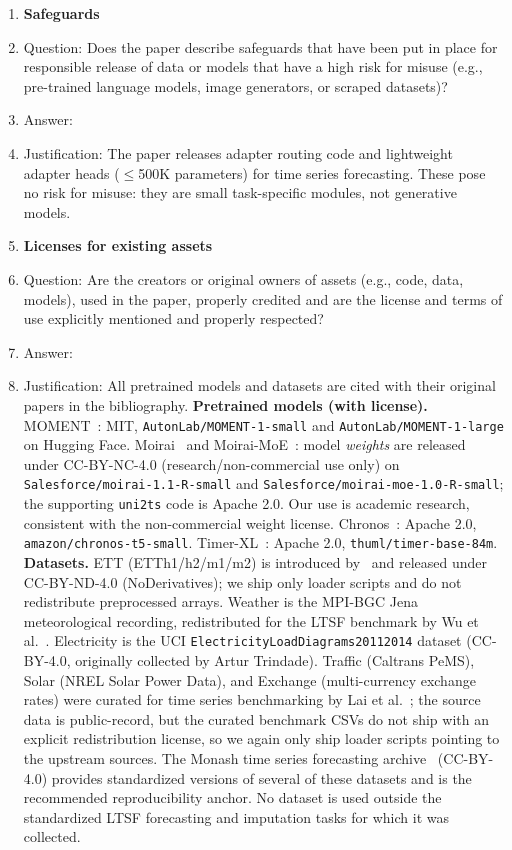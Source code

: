 \begin{enumerate}
\item {\bf Safeguards}
    \item[] Question: Does the paper describe safeguards that have been put in place for responsible release of data or models that have a high risk for misuse (e.g., pre-trained language models, image generators, or scraped datasets)?
    \item[] Answer: \answerNA{}
    \item[] Justification: The paper releases adapter routing code and lightweight adapter heads ($\leq$500K parameters) for time series forecasting. These pose no risk for misuse: they are small task-specific modules, not generative models.

\item {\bf Licenses for existing assets}
    \item[] Question: Are the creators or original owners of assets (e.g., code, data, models), used in the paper, properly credited and are the license and terms of use explicitly mentioned and properly respected?
    \item[] Answer: \answerYes{}
    \item[] Justification: All pretrained models and datasets are cited with their original papers in the bibliography. \textbf{Pretrained models (with license).} MOMENT~\citep{goswami2024moment}: MIT, \texttt{AutonLab/MOMENT-1-small} and \texttt{AutonLab/MOMENT-1-large} on Hugging Face. Moirai~\citep{woo2024moirai} and Moirai-MoE~\citep{liu2025moiraimoe}: model \emph{weights} are released under CC-BY-NC-4.0 (research/non-commercial use only) on \texttt{Salesforce/moirai-1.1-R-small} and \texttt{Salesforce/moirai-moe-1.0-R-small}; the supporting \texttt{uni2ts} code is Apache 2.0. Our use is academic research, consistent with the non-commercial weight license. Chronos~\citep{ansari2024chronos}: Apache 2.0, \texttt{amazon/chronos-t5-small}. Timer-XL~\citep{liu2025timerxl}: Apache 2.0, \texttt{thuml/timer-base-84m}. \textbf{Datasets.} ETT (ETTh1/h2/m1/m2) is introduced by~\citet{zhou2021informer} and released under CC-BY-ND-4.0 (NoDerivatives); we ship only loader scripts and do not redistribute preprocessed arrays. Weather is the MPI-BGC Jena meteorological recording, redistributed for the LTSF benchmark by Wu et al.~\citep{wu2021autoformer}. Electricity is the UCI \texttt{ElectricityLoadDiagrams20112014} dataset (CC-BY-4.0, originally collected by Artur Trindade). Traffic (Caltrans PeMS), Solar (NREL Solar Power Data), and Exchange (multi-currency exchange rates) were curated for time series benchmarking by Lai et al.~\citep{lai2018lstnet}; the source data is public-record, but the curated benchmark CSVs do not ship with an explicit redistribution license, so we again only ship loader scripts pointing to the upstream sources. The Monash time series forecasting archive~\citep{godahewa2021monash} (CC-BY-4.0) provides standardized versions of several of these datasets and is the recommended reproducibility anchor. No dataset is used outside the standardized LTSF forecasting and imputation tasks for which it was collected.


\end{enumerate}
